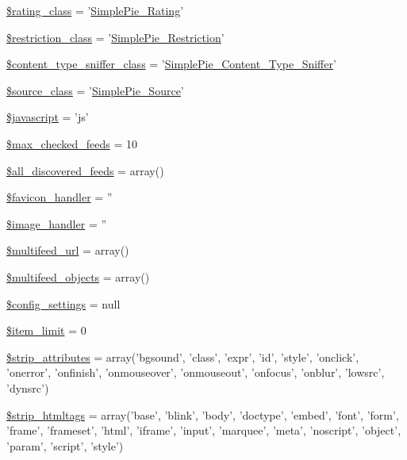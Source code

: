 \begin{DoxyCompactItemize}
\item 
\hyperlink{class_simple_pie_a2cd74b9306d0b77e767c2bffee1c45c0}{\$rating\-\_\-class} = '\hyperlink{class_simple_pie___rating}{Simple\-Pie\-\_\-\-Rating}'
\item 
\hyperlink{class_simple_pie_a5b0f938c21e0e032f0f428c0bd251fda}{\$restriction\-\_\-class} = '\hyperlink{class_simple_pie___restriction}{Simple\-Pie\-\_\-\-Restriction}'
\item 
\hyperlink{class_simple_pie_aedd80075134cd3af3446b53b2221f09c}{\$content\-\_\-type\-\_\-sniffer\-\_\-class} = '\hyperlink{class_simple_pie___content___type___sniffer}{Simple\-Pie\-\_\-\-Content\-\_\-\-Type\-\_\-\-Sniffer}'
\item 
\hyperlink{class_simple_pie_a8c05b90566d16d335054ed292cbe1de2}{\$source\-\_\-class} = '\hyperlink{class_simple_pie___source}{Simple\-Pie\-\_\-\-Source}'
\item 
\hyperlink{class_simple_pie_a27c41df0143d9ed630fd4a564bef8133}{\$javascript} = 'js'
\item 
\hyperlink{class_simple_pie_ac9904f4b93fbda343e062052e7b54fdf}{\$max\-\_\-checked\-\_\-feeds} = 10
\item 
\hyperlink{class_simple_pie_af59339d23d7c0b6590395a26c9c60d37}{\$all\-\_\-discovered\-\_\-feeds} = array()
\item 
\hyperlink{class_simple_pie_a26c2235fde0b5b0f0f93bbd09c471818}{\$favicon\-\_\-handler} = ''
\item 
\hyperlink{class_simple_pie_afaf5a32eb0e0ebbd1fd58da8bae0501c}{\$image\-\_\-handler} = ''
\item 
\hyperlink{class_simple_pie_a8d1e8614e9d3ec800c9d4ce8ae5727e5}{\$multifeed\-\_\-url} = array()
\item 
\hyperlink{class_simple_pie_a7d7cbc62b0fbeaa584afd75e0ed7d87c}{\$multifeed\-\_\-objects} = array()
\item 
\hyperlink{class_simple_pie_adc78dd0207cce3867fc182577678fed6}{\$config\-\_\-settings} = null
\item 
\hyperlink{class_simple_pie_ad221549e52ebd9aebfd7523bb9ea88ec}{\$item\-\_\-limit} = 0
\item 
\hyperlink{class_simple_pie_af9901feeacfb99c20f9350a5d06a618f}{\$strip\-\_\-attributes} = array('bgsound', 'class', 'expr', 'id', 'style', 'onclick', 'onerror', 'onfinish', 'onmouseover', 'onmouseout', 'onfocus', 'onblur', 'lowsrc', 'dynsrc')
\item 
\hyperlink{class_simple_pie_a21a4745bf8bd70abba7f6fd9352cecbd}{\$strip\-\_\-htmltags} = array('base', 'blink', 'body', 'doctype', 'embed', 'font', 'form', 'frame', 'frameset', 'html', 'iframe', 'input', 'marquee', 'meta', 'noscript', 'object', 'param', 'script', 'style')
\end{DoxyCompactItemize}


